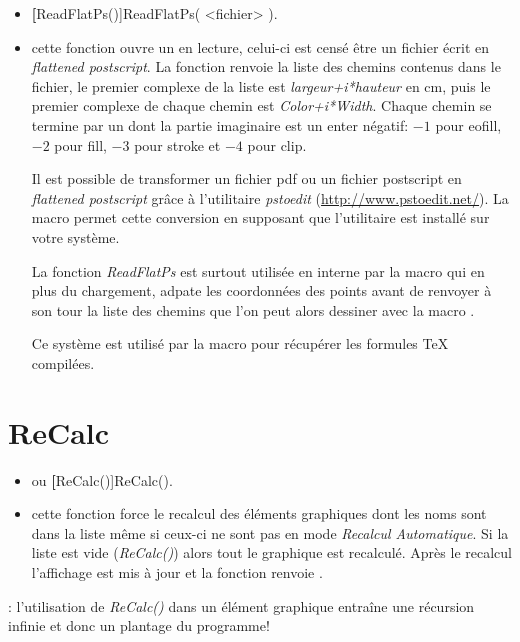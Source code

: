 \begin{itemize}
 \item \util \textbf[ReadFlatPs()]{ReadFlatPs( <fichier> )}.
 \item \desc cette fonction ouvre un  en lecture, celui-ci est censé être un fichier écrit en \textit{flattened postscript}. La fonction renvoie la liste des chemins contenus dans le fichier, le premier complexe de la liste est \textit{largeur+i*hauteur} en cm, puis le premier complexe de chaque chemin est \textit{Color+i*Width}. Chaque chemin se termine par un \jump dont la partie imaginaire est un enter négatif: $-1$ pour eofill, $-2$ pour fill, $-3$ pour stroke et $-4$ pour clip.

 Il est possible de transformer un fichier pdf ou un fichier postscript en \textit{flattened postscript} grâce à l'utilitaire \textit{pstoedit} (\url{http://www.pstoedit.net/}). La macro  permet cette conversion en supposant que l'utilitaire est installé sur votre système.

 La fonction \textsl{ReadFlatPs} est surtout utilisée en interne par la macro  qui en plus du chargement, adpate les coordonnées des points avant de renvoyer à son tour la liste des chemins que l'on peut alors dessiner avec la macro .

 Ce système est utilisé par la macro  pour récupérer les formules TeX compilées.
\end{itemize}


\section{ReCalc}\label{cmdReCalc}

\begin{itemize}
 \item \util {} ou \textbf[ReCalc()]{ReCalc()}.
 \item \desc cette fonction force le recalcul des éléments graphiques dont les noms sont dans la liste même si ceux-ci ne sont pas en mode \textsl{Recalcul Automatique}. Si la liste est vide (\textsl{ReCalc()}) alors tout le graphique est recalculé. Après le recalcul l'affichage est mis à jour et la fonction renvoie \Nil.
\end{itemize}

: l'utilisation de \textsl{ReCalc()} dans un élément graphique entraîne une récursion infinie et donc un plantage du programme!

